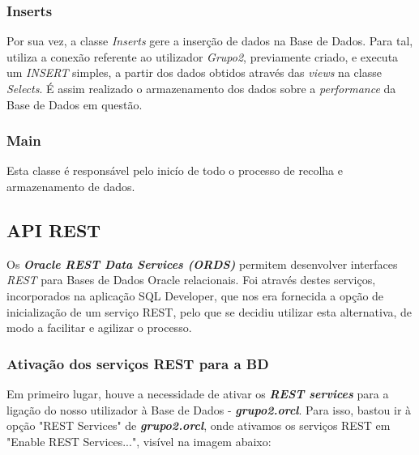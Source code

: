 \documentclass[a4paper]{article}
\begin{document}
\subsubsection{Inserts}
\hspace{3mm} 

Por sua vez, a classe \emph{Inserts} gere a inserção de dados na Base de Dados. Para tal, utiliza a conexão referente ao utilizador \emph{Grupo2}, previamente criado, e executa um \emph{INSERT} simples, a partir dos dados obtidos através das \emph{views} na classe \emph{Selects}. É assim realizado o armazenamento dos dados sobre a \emph{performance} da Base de Dados em questão. 

\subsubsection{Main}
\hspace{3mm} 

Esta classe é responsável pelo inicío de todo o processo de recolha e armazenamento de dados.\\

\subsection{API REST}
\hspace{3mm} 

Os \emph{\textbf{Oracle REST Data Services (ORDS)}} permitem desenvolver interfaces \emph{REST} para Bases de Dados Oracle relacionais. Foi através destes serviços, incorporados na aplicação SQL Developer, que nos era fornecida a opção de inicialização de um serviço REST, pelo que se decidiu utilizar esta alternativa, de modo a facilitar e agilizar o processo.

\subsubsection{Ativação dos serviços REST para a BD}
\hspace{3mm} 

Em primeiro lugar, houve a necessidade de ativar os  \emph{\textbf{REST services}} para a ligação do nosso utilizador à Base de Dados -  \emph{\textbf{grupo2.orcl}}. Para isso, bastou ir à opção "REST Services" de \emph{\textbf{grupo2.orcl}}, onde ativamos os serviços REST em "Enable REST Services...", visível na imagem abaixo:
\end{document}

